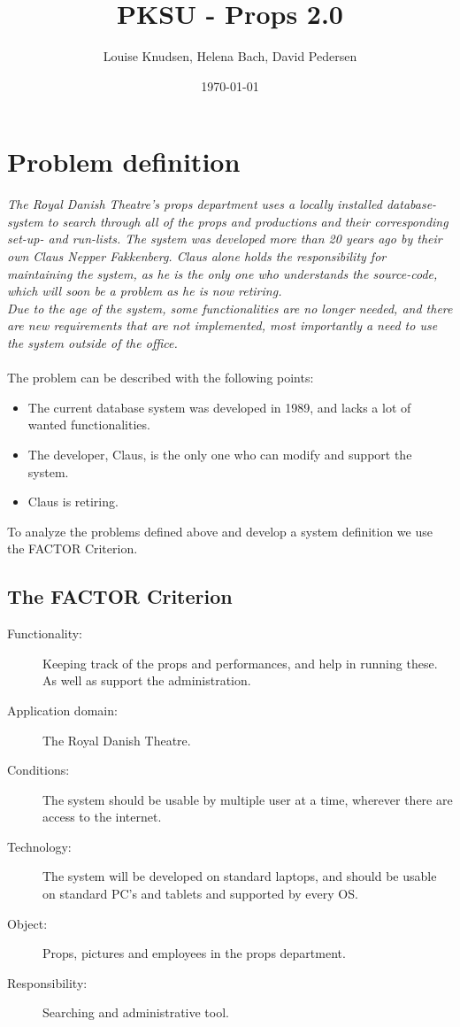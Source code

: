 \documentclass[12pt]{article}
\title{PKSU - Props 2.0}
\author{Louise Knudsen, Helena Bach, David Pedersen}
\date{\today}
\begin{document}
\maketitle
\section{Problem definition}
\textit{The Royal Danish Theatre's props department uses a locally installed database-system to search through all of the props and productions and their corresponding set-up- and run-lists. The system was developed more than 20 years ago by their own Claus Nepper Fakkenberg. Claus alone holds the responsibility for maintaining the system, as he is the only one who understands the source-code, which will soon be a problem as he is now retiring. \\
Due to the age of the system, some functionalities are no longer needed, and there are new requirements that are not implemented, most importantly a need to use the system outside of the office.} \\\\
The problem can be described with the following points:
\begin{itemize}
  \item The current database system was developed in 1989, and lacks a lot of wanted functionalities.
  \item The developer, Claus, is the only one who can modify and support the system.
  \item Claus is retiring.
\end{itemize}
To analyze the problems defined above and develop a system definition we use the FACTOR Criterion.
\subsection{The FACTOR Criterion}
\begin{description}
  \item[Functionality:] Keeping track of the props and performances, and help in running these. As well as support the administration.
  \item[Application domain:] The Royal Danish Theatre.
  \item[Conditions:] The system should be usable by multiple user at a time, wherever there are access to the internet.
  \item[Technology:] The system will be developed on standard laptops, and should be usable on standard PC's and tablets and supported by every OS.
  \item[Object:] Props, pictures and employees in the props department.
  \item[Responsibility:] Searching and administrative tool.
\end{description}
\end{document}

